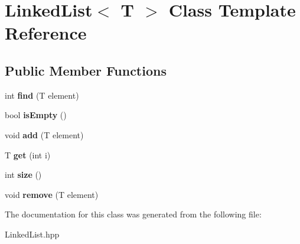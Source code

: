 \hypertarget{class_linked_list}{}\section{Linked\+List$<$ T $>$ Class Template Reference}
\label{class_linked_list}
\subsection*{Public Member Functions}
\begin{DoxyCompactItemize}
\item 
\mbox{\label{class_linked_list_a924e217dd525b84492e9f0dc61db96bc}} 
int {\bfseries find} (T element)
\item 
\mbox{\label{class_linked_list_a7ecbb28e82117a680839ed0dc28ebdce}} 
bool {\bfseries is\+Empty} ()
\item 
\mbox{\label{class_linked_list_ab7364799e5965dd59d4f5952cb953287}} 
void {\bfseries add} (T element)
\item 
\mbox{\label{class_linked_list_a76d26f9fc7b344dc1d5bb81b853ae96e}} 
T {\bfseries get} (int i)
\item 
\mbox{\label{class_linked_list_ab8388ea027c2de8125f5d1e5901c2b2e}} 
int {\bfseries size} ()
\item 
\mbox{\label{class_linked_list_a6c4973ae9956ddb037a9093cffa2adb1}} 
void {\bfseries remove} (T element)
\end{DoxyCompactItemize}


The documentation for this class was generated from the following file\+:\begin{DoxyCompactItemize}
\item 
Linked\+List.\+hpp\end{DoxyCompactItemize}
